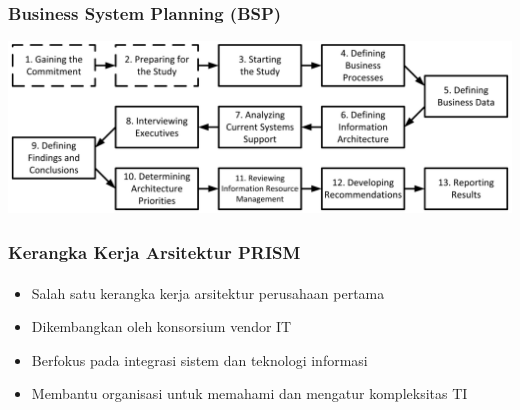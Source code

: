 \documentclass[aspectratio=169, table]{beamer}
\begin{document}
	{
		\begin{frame}
			\frametitle{Business System Planning (BSP)}
			\begin{center}
				\includegraphics[width=\textwidth]{../figures/bsp}
			\end{center}
		\end{frame}
	}

	\begin{frame}
		\frametitle{Kerangka Kerja Arsitektur PRISM}
        \framesubtitle{\hspace{1cm}}
		\begin{itemize}
			\item Salah satu kerangka kerja arsitektur perusahaan pertama
			\item Dikembangkan oleh konsorsium vendor IT
			\item Berfokus pada integrasi sistem dan teknologi informasi
			\item Membantu organisasi untuk memahami dan mengatur kompleksitas TI
		\end{itemize}
	\end{frame}
\end{document}

